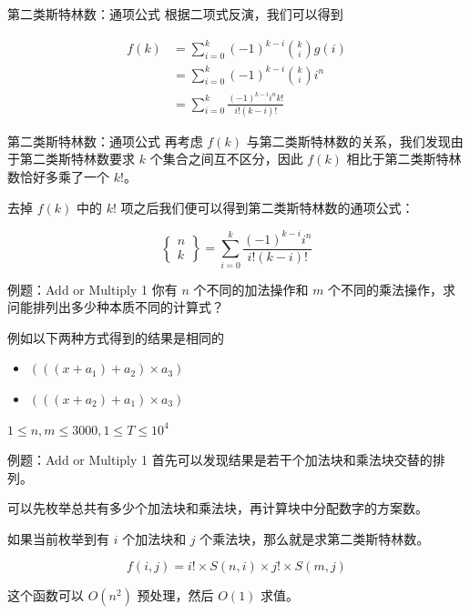 \documentclass[12pt,aspectratio=169]{beamer}
\begin{document}
\begin{frame}[fragile]{第二类斯特林数：通项公式}
根据二项式反演，我们可以得到

$$
\begin{aligned}
f(k) &= \sum_{i=0}^{k} (-1)^{k-i} {k \choose i} g(i) \\
     &= \sum_{i=0}^{k} (-1)^{k-i} {k \choose i} i^n \\
     &= \sum_{i=0}^{k} \frac{(-1)^{k-i} i^n k!}{i! (k-i)!}
\end{aligned}
$$
\end{frame}

\begin{frame}[fragile]{第二类斯特林数：通项公式}
再考虑 $f(k)$ 与第二类斯特林数的关系，我们发现由于第二类斯特林数要求 $k$ 个集合之间互不区分，因此 $f(k)$ 相比于第二类斯特林数恰好多乘了一个 $k!$。

去掉 $f(k)$ 中的 $k!$ 项之后我们便可以得到第二类斯特林数的通项公式：

$$
\begin{Bmatrix}n\\ k\end{Bmatrix} = \sum_{i=0}^{k} \frac{(-1)^{k-i} i^n}{i! (k-i)!}
$$
\end{frame}

\begin{frame}[fragile]{例题：Add or Multiply 1}
  你有 $n$ 个不同的加法操作和 $m$ 个不同的乘法操作，求问能排列出多少种本质不同的计算式？

  例如以下两种方式得到的结果是相同的

  \begin{itemize}
    \item $(((x + a_1) + a_2) \times a_3)$
    \item $(((x + a_2) + a_1) \times a_3)$
  \end{itemize}

  $1 \le n, m \le 3000, 1 \le T \le 10^4$
\end{frame}

\begin{frame}[fragile]{例题：Add or Multiply 1}
  首先可以发现结果是若干个加法块和乘法块交替的排列。

  可以先枚举总共有多少个加法块和乘法块，再计算块中分配数字的方案数。

  如果当前枚举到有 $i$ 个加法块和 $j$ 个乘法块，那么就是求第二类斯特林数。

  $$
  f(i, j) = i! \times S(n, i) \times j! \times S(m, j) 
  $$

  这个函数可以 $O(n^2)$ 预处理，然后 $O(1)$ 求值。
\end{frame}
\end{document}
